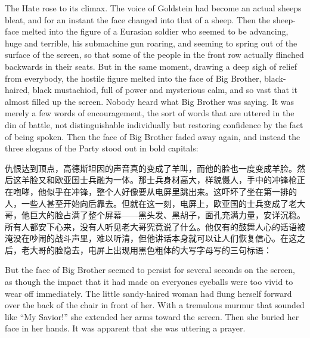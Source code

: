 \begin{paracol}{2}
\switchcolumn*

The Hate rose to its climax. The voice of Goldstein had become an actual
sheep\textquotesingle s bleat, and for an instant the face changed into
that of a sheep. Then the sheep-face melted into the figure of a
Eurasian soldier who seemed to be advancing, huge and terrible, his
submachine gun roaring, and seeming to spring out of the surface of the
screen, so that some of the people in the front row actually flinched
backwards in their seats. But in the same moment, drawing a deep sigh of
relief from everybody, the hostile figure melted into the face of Big
Brother, black-haired, black mustachio\textquotesingle d, full of power
and mysterious calm, and so vast that it almost filled up the screen.
Nobody heard what Big Brother was saying. It was merely a few words of
encouragement, the sort of words that are uttered in the din of battle,
not distinguishable individually but restoring confidence by the fact of
being spoken. Then the face of Big Brother faded away again, and instead
the three slogans of the Party stood out in bold capitals:

\switchcolumn

仇恨达到顶点，高德斯坦因的声音真的变成了羊叫，而他的脸也一度变成羊脸。然后这羊脸又和欧亚国士兵融为一体。那士兵身材高大，样貌慑人，手中的冲锋枪正在咆哮，他似乎在冲锋，整个人好像要从电屏里跳出来。这吓坏了坐在第一排的人，一些人甚至开始向后靠去。但就在这一刻，电屏上，欧亚国的士兵变成了老大哥，他巨大的脸占满了整个屏幕——黑头发、黑胡子，面孔充满力量，安详沉稳。所有人都安下心来，没有人听见老大哥究竟说了什么。他仅有的鼓舞人心的话语被淹没在吵闹的战斗声里，难以听清，但他讲话本身就可以让人们恢复信心。在这之后，老大哥的脸隐去，电屏上出现用黑色粗体的大写字母写的三句标语：

\switchcolumn*


\switchcolumn


\switchcolumn*

But the face of Big Brother seemed to persist for several seconds on the
screen, as though the impact that it had made on
everyone\textquotesingle s eyeballs were too vivid to wear off
immediately. The little sandy-haired woman had flung herself forward
over the back of the chair in front of her. With a tremulous murmur that
sounded like ``My Savior!'' she extended her arms toward the screen. Then
she buried her face in her hands. It was apparent that she was uttering
a prayer.


\end{paracol}
